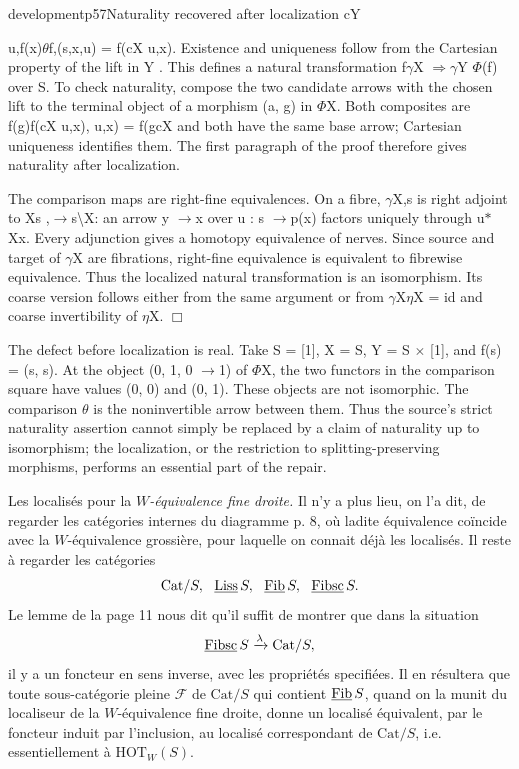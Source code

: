 \begin{dcomment}{development}{p57}{Naturality recovered after localization}
cY

u,f(x)\ensuremath{\theta}f,(s,x,u) = f(cX u,x). Existence and uniqueness follow from the Cartesian property of the lift in Y . This defines a natural transformation f\ensuremath{\gamma}X \ensuremath{\Rightarrow}\ensuremath{\gamma}Y \ensuremath{\Phi}(f) over S. To check naturality, compose the two candidate arrows with the chosen lift to the terminal object of a morphism (a, g) in \ensuremath{\Phi}X. Both composites are f(g)f(cX u,x), u,x) = f(gcX and both have the same base arrow; Cartesian uniqueness identifies them. The first paragraph of the proof therefore gives naturality after localization.

The comparison maps are right-fine equivalences. On a fibre, \ensuremath{\gamma}X,s is right adjoint to Xs ,\ensuremath{\to}s\textbackslash{}X: an arrow y \ensuremath{\to}x over u : s \ensuremath{\to}p(x) factors uniquely through u\ensuremath{*} Xx. Every adjunction gives a homotopy equivalence of nerves. Since source and target of \ensuremath{\gamma}X are fibrations, right-fine equivalence is equivalent to fibrewise equivalence. Thus the localized natural transformation is an isomorphism. Its coarse version follows either from the same argument or from \ensuremath{\gamma}X\ensuremath{\eta}X = id and coarse invertibility of \ensuremath{\eta}X. \ensuremath{\Box}

The defect before localization is real. Take S = [1], X = S, Y = S \ensuremath{\times} [1], and f(s) = (s, s). At the object (0, 1, 0 \ensuremath{\to}1) of \ensuremath{\Phi}X, the two functors in the comparison square have values (0, 0) and (0, 1). These objects are not isomorphic. The comparison \ensuremath{\theta} is the noninvertible arrow between them. Thus the source’s strict naturality assertion cannot simply be replaced by a claim of naturality up to isomorphism; the localization, or the restriction to splitting-preserving morphisms, performs an essential part of the repair.

\end{dcomment}


 Les localisés pour la \textit{$W$-équivalence fine droite.} Il n'y a plus lieu, on l'a dit, de regarder les catégories internes du diagramme p. 8, où ladite équivalence coïncide avec la $W$-équivalence grossière, pour laquelle on connait déjà les localisés. Il reste à regarder les catégories
\[\mathrm{Cat}/S,\ \ \ul{Liss}\,S,\ \ \ul{Fib}\,S,\ \ \ul{Fibsc}\,S.\]
Le lemme de la page 11 nous dit qu'il suffit de montrer que dans la situation
\[\underline{\mathrm{Fibsc}}\,S \xrightarrow{\lambda} \mathrm{Cat}/S,\]
il y a un foncteur en sens inverse, avec les propriétés specifiées. Il en résultera que toute sous-catégorie pleine $\mathcal{F}$ de $\mathrm{Cat}/S$ qui contient $\underline{\mathrm{Fib}}\,S$, quand on la munit du localiseur de la $W$-équivalence fine droite, donne un localisé équivalent, par le foncteur induit par l'inclusion, au localisé correspondant de $\mathrm{Cat}/S$, i.e. essentiellement à $\mathrm{HOT}_W(S)$. %

